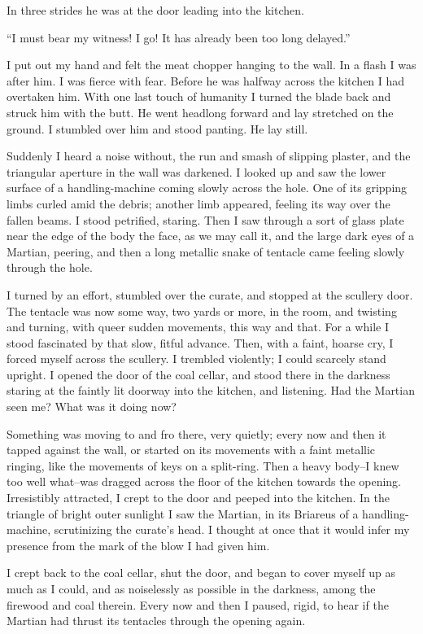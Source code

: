 In three strides he was at the door leading into the kitchen.

``I must bear my witness! I go! It has already been too long
delayed.''

I put out my hand and felt the meat chopper hanging to the wall. In
a flash I was after him. I was fierce with fear. Before he was
halfway across the kitchen I had overtaken him. With one last touch
of humanity I turned the blade back and struck him with the butt.
He went headlong forward and lay stretched on the ground. I
stumbled over him and stood panting. He lay still.

Suddenly I heard a noise without, the run and smash of slipping
plaster, and the triangular aperture in the wall was darkened. I
looked up and saw the lower surface of a handling-machine coming
slowly across the hole. One of its gripping limbs curled amid the
debris; another limb appeared, feeling its way over the fallen
beams. I stood petrified, staring. Then I saw through a sort of
glass plate near the edge of the body the face, as we may call it,
and the large dark eyes of a Martian, peering, and then a long
metallic snake of tentacle came feeling slowly through the hole.

I turned by an effort, stumbled over the curate, and stopped at the
scullery door. The tentacle was now some way, two yards or more, in
the room, and twisting and turning, with queer sudden movements,
this way and that. For a while I stood fascinated by that slow,
fitful advance. Then, with a faint, hoarse cry, I forced myself
across the scullery. I trembled violently; I could scarcely stand
upright. I opened the door of the coal cellar, and stood there in
the darkness staring at the faintly lit doorway into the kitchen,
and listening. Had the Martian seen me? What was it doing now?

Something was moving to and fro there, very quietly; every now and
then it tapped against the wall, or started on its movements with a
faint metallic ringing, like the movements of keys on a split-ring.
Then a heavy body--I knew too well what--was dragged across the
floor of the kitchen towards the opening. Irresistibly attracted, I
crept to the door and peeped into the kitchen. In the triangle of
bright outer sunlight I saw the Martian, in its Briareus of a
handling-machine, scrutinizing the curate's head. I thought at once
that it would infer my presence from the mark of the blow I had
given him.

I crept back to the coal cellar, shut the door, and began to cover
myself up as much as I could, and as noiselessly as possible in the
darkness, among the firewood and coal therein. Every now and then I
paused, rigid, to hear if the Martian had thrust its tentacles
through the opening again.

